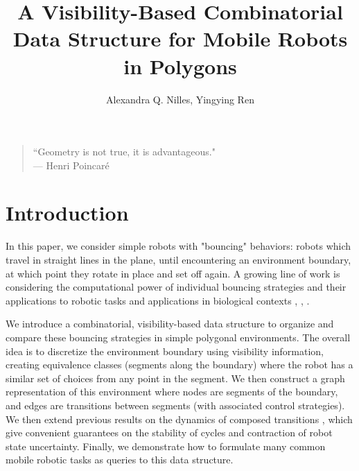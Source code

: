\documentclass[letterpaper, 10 pt, conference]{ieeeconf}  %
\title{A Visibility-Based Combinatorial Data Structure for
Mobile Robots in Polygons}
\author{Alexandra Q. Nilles, Yingying Ren%
}
\begin{document}
\maketitle

%

{\small
\begin{center}
\begin{quotation}
``Geometry is not true, it is advantageous." \\
\hfill    --- Henri Poincar\'e
\end{quotation}
\end{center}
}

\section{Introduction} 
In this paper, we consider simple robots with "bouncing" behaviors: robots which travel in straight lines in the plane, until encountering an environment boundary, at which point they rotate in place and set off again. A growing line of work is considering the computational power of individual bouncing strategies and their applications to robotic tasks and applications in biological contexts \cite{erickson2013toward}, \cite{microorg}, \cite{alam2017minimalist}. 

We introduce a combinatorial, visibility-based data structure to organize and compare these bouncing strategies in simple polygonal environments. The overall idea is to discretize the environment boundary using visibility information, creating equivalence classes (segments along the boundary) where the robot has a similar set of choices from any point in the segment. We then construct a graph representation of this environment where nodes are segments of the boundary, and edges are transitions between segments (with associated control strategies). We then extend previous results on the dynamics of composed transitions \cite{nilles2017periodic}, which give convenient guarantees on the stability of cycles and contraction of robot state uncertainty. Finally, we demonstrate how to formulate many common mobile robotic tasks as queries to this data structure.
\end{document}
